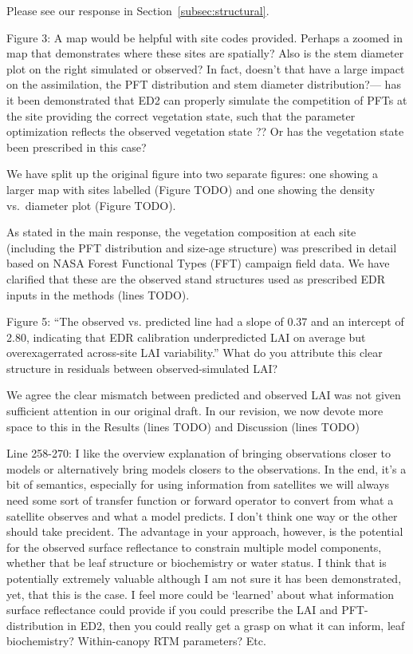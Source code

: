 Please see our response in Section~\ref{subsec:structural}.

\begin{reviewer}
  Figure 3: A map would be helpful with site codes provided. Perhaps a zoomed in map that demonstrates where these sites are spatially? Also is the stem diameter plot on the right simulated or observed? In fact, doesn’t that have a large impact on the assimilation, the PFT distribution and stem diameter distribution?— has it been demonstrated that ED2 can properly simulate the competition of PFTs at the site providing the correct vegetation state, such that the parameter optimization reflects the observed vegetation state ?? Or has the vegetation state been prescribed in this case?
\end{reviewer}

We have split up the original figure into two separate figures:
one showing a larger map with sites labelled (Figure TODO) and one showing the density vs.\ diameter plot (Figure TODO).

As stated in the main response, the vegetation composition at each site (including the PFT distribution and size-age structure) was prescribed in detail based on NASA Forest Functional Types (FFT) campaign field data. We have clarified that these are the observed stand structures used as prescribed EDR inputs in the methods (lines TODO).

\begin{reviewer}
  Figure 5: “The observed vs. predicted line had a slope of 0.37 and an intercept of 2.80, indicating that EDR calibration underpredicted LAI on average but overexagerrated across-site LAI variability.” What do you attribute this clear structure in residuals between observed-simulated LAI?
\end{reviewer}

We agree the clear mismatch between predicted and observed LAI was not given sufficient attention in our original draft.
In our revision, we now devote more space to this in the Results (lines TODO) and Discussion (lines TODO)

\begin{reviewer}
  Line 258-270: I like the overview explanation of bringing observations closer to models or alternatively bring models closers to the observations. In the end, it’s a bit of semantics, especially for using information from satellites we will always need some sort of transfer function or forward operator to convert from what a satellite observes and what a model predicts. I don’t think one way or the other should take precident. The advantage in your approach, however, is the potential for the observed surface reflectance to constrain multiple model components, whether that be leaf structure or biochemistry or water status. I think that is potentially extremely valuable although I am not sure it has been demonstrated, yet, that this is the case. I feel more could be ‘learned’ about what information surface reflectance could provide if you could prescribe the LAI and PFT-distribution in ED2, then you could really get a grasp on what it can inform, leaf biochemistry? Within-canopy RTM parameters? Etc.
\end{reviewer}

